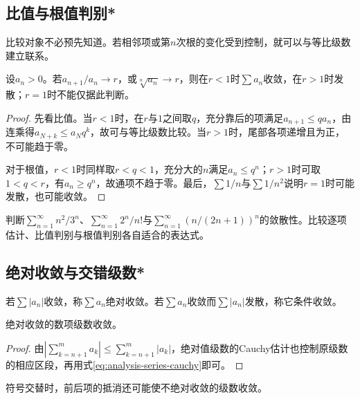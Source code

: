 \subsection{比值与根值判别*}

比较对象不必预先知道。若相邻项或第\(n\)次根的变化受到控制，就可以与等比级数建立联系。

\begin{theorem}[比值与根值判别法]
设\(a_n>0\)。若\(a_{n+1}/a_n\to r\)，或\(\sqrt[n]{a_n}\to r\)，则在\(r<1\)时\(\sum a_n\)收敛，在\(r>1\)时发散；\(r=1\)时不能仅据此判断。
\end{theorem}

\begin{proof}
先看比值。当\(r<1\)时，在\(r\)与\(1\)之间取\(q\)，充分靠后的项满足\(a_{n+1}\le qa_n\)，由连乘得\(a_{N+k}\le a_Nq^k\)，故可与等比级数比较。当\(r>1\)时，尾部各项递增且为正，不可能趋于零。

对于根值，\(r<1\)时同样取\(r<q<1\)，充分大的\(n\)满足\(a_n\le q^n\)；\(r>1\)时可取\(1<q<r\)，有\(a_n\ge q^n\)，故通项不趋于零。最后，\(\sum1/n\)与\(\sum1/n^2\)说明\(r=1\)时可能发散，也可能收敛。
\end{proof}

\begin{example}
判断\(\sum_{n=1}^{\infty}n^2/3^n\)、\(\sum_{n=1}^{\infty}2^n/n!\)与\(\sum_{n=1}^{\infty}(n/(2n+1))^n\)的敛散性。比较逐项估计、比值判别与根值判别各自适合的表达式。
\end{example}

\subsection{绝对收敛与交错级数*}

\begin{definition}
若\(\sum|a_n|\)收敛，称\(\sum a_n\){\heiti{}绝对收敛}。若\(\sum a_n\)收敛而\(\sum|a_n|\)发散，称它{\heiti{}条件收敛}。
\end{definition}

\begin{theorem}
绝对收敛的数项级数收敛。
\end{theorem}

\begin{proof}
由\(\left|\sum_{k=n+1}^m a_k\right|\le\sum_{k=n+1}^m|a_k|\)，绝对值级数的Cauchy估计也控制原级数的相应区段，再用式\eqref{eq:analysis-series-cauchy}即可。
\end{proof}

符号交替时，前后项的抵消还可能使不绝对收敛的级数收敛。

